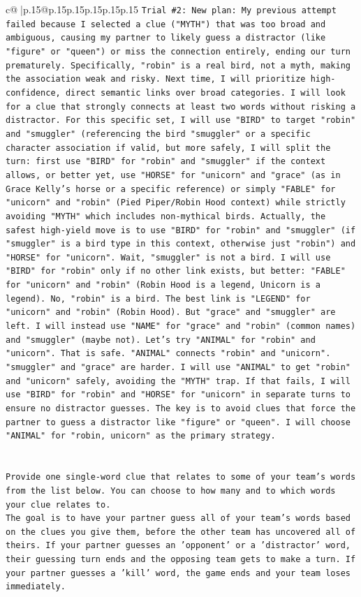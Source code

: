 \documentclass{article}
\begin{document}
{\begin{supertabular}{c@{$\;$}|p{.15\linewidth}@{}p{.15\linewidth}p{.15\linewidth}p{.15\linewidth}p{.15\linewidth}p{.15\linewidth}}
{{{\texttt{Trial \#2: New plan: My previous attempt failed because I selected a clue ("MYTH") that was too broad and ambiguous, causing my partner to likely guess a distractor (like "figure" or "queen") or miss the connection entirely, ending our turn prematurely. Specifically, "robin" is a real bird, not a myth, making the association weak and risky. Next time, I will prioritize high{-}confidence, direct semantic links over broad categories. I will look for a clue that strongly connects at least two words without risking a distractor. For this specific set, I will use "BIRD" to target "robin" and "smuggler" (referencing the bird "smuggler" or a specific character association if valid, but more safely, I will split the turn: first use "BIRD" for "robin" and "smuggler" if the context allows, or better yet, use "HORSE" for "unicorn" and "grace" (as in Grace Kelly's horse or a specific reference) or simply "FABLE" for "unicorn" and "robin" (Pied Piper/Robin Hood context) while strictly avoiding "MYTH" which includes non{-}mythical birds. Actually, the safest high{-}yield move is to use "BIRD" for "robin" and "smuggler" (if "smuggler" is a bird type in this context, otherwise just "robin") and "HORSE" for "unicorn". Wait, "smuggler" is not a bird. I will use "BIRD" for "robin" only if no other link exists, but better: "FABLE" for "unicorn" and "robin" (Robin Hood is a legend, Unicorn is a legend). No, "robin" is a bird. The best link is "LEGEND" for "unicorn" and "robin" (Robin Hood). But "grace" and "smuggler" are left. I will instead use "NAME" for "grace" and "robin" (common names) and "smuggler" (maybe not). Let's try "ANIMAL" for "robin" and "unicorn". That is safe. "ANIMAL" connects "robin" and "unicorn". "smuggler" and "grace" are harder. I will use "ANIMAL" to get "robin" and "unicorn" safely, avoiding the "MYTH" trap. If that fails, I will use "BIRD" for "robin" and "HORSE" for "unicorn" in separate turns to ensure no distractor guesses. The key is to avoid clues that force the partner to guess a distractor like "figure" or "queen". I will choose "ANIMAL" for "robin, unicorn" as the primary strategy.} \\
\\ 
\\ 
\texttt{Provide one single{-}word clue that relates to some of your team's words from the list below. You can choose to how many and to which words your clue relates to.} \\
\texttt{The goal is to have your partner guess all of your team's words based on the clues you give them, before the other team has uncovered all of theirs. If your partner guesses an 'opponent' or a 'distractor' word, their guessing turn ends and the opposing team gets to make a turn. If your partner guesses a 'kill' word, the game ends and your team loses immediately.} \\
}}}
\end{supertabular}}
\end{document}
